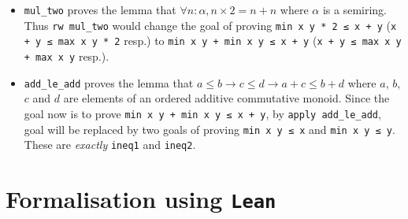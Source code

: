 \documentclass{report}
\theoremstyle{definition}
\begin{document}
\begin{itemize}
  \item {\tt \small mul\_two} proves the lemma that $\forall n:\alpha, n\times 2 = n+n$ where $\alpha$ is a semiring. Thus {\tt \small rw mul\_two} would change the goal of proving {\tt \small min x y * 2 ≤ x + y} ({\tt \small x + y ≤ max x y * 2} resp.) to {\tt \small min x y + min x y ≤ x + y} ({\tt \small x + y ≤ max x y + max x y} resp.).
  \item {\tt \small add\_le\_add} proves the lemma that $a \le b \to c \le d \to a + c \le b + d$ where $a$, $b$, $c$ and $d$ are elements of an ordered additive commutative monoid. Since the goal now is to prove {\tt \small min x y + min x y ≤ x + y}, by {\tt \small apply add\_le\_add}, goal will be replaced by two goals of proving {\tt \small min x y ≤ x} and {\tt \small min x y ≤ y}. These are {\it exactly} {\tt \small ineq1} and {\tt \small ineq2}.
\end{itemize}

\chapter{Formalisation using {\tt Lean}}\label{fmlsn}
\end{document}
